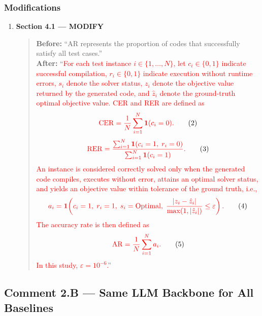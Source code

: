 \documentclass[11pt,a4paper]{article}
\begin{document}
\subsubsection{Modifications}
\begin{enumerate}
\item \textbf{Section 4.1 --- MODIFY}
\begin{quote}
\textbf{Before:} ``AR represents the proportion of codes that successfully satisfy all test cases.''\\[4pt]
\textbf{After:} ``\textcolor{red}{For each test instance $i \in \{1,\dots,N\}$, let $c_i \in \{0,1\}$ indicate successful compilation, $r_i \in \{0,1\}$ indicate execution without runtime errors, $s_i$ denote the solver status, $z_i$ denote the objective value returned by the generated code, and $\hat z_i$ denote the ground-truth optimal objective value. CER and RER are defined as}
\begin{equation}
\textcolor{red}{\mathrm{CER}=\frac{1}{N}\sum_{i=1}^{N}\mathbf{1}(c_i=0).} \tag{2}
\end{equation}
\begin{equation}
\textcolor{red}{\mathrm{RER}=\frac{\sum_{i=1}^{N}\mathbf{1}(c_i=1,\; r_i=0)}{\sum_{i=1}^{N}\mathbf{1}(c_i=1)}.} \tag{3}
\end{equation}
\textcolor{red}{An instance is considered correctly solved only when the generated code compiles, executes without error, attains an optimal solver status, and yields an objective value within tolerance of the ground truth, i.e.,}
\begin{equation}
\textcolor{red}{a_i=\mathbf{1}\!\left(c_i=1,\; r_i=1,\; s_i=\mathrm{Optimal},\; \frac{|z_i-\hat z_i|}{\max(1,|\hat z_i|)}\le \varepsilon\right).} \tag{4}
\end{equation}
\textcolor{red}{The accuracy rate is then defined as}
\begin{equation}
\textcolor{red}{\mathrm{AR}=\frac{1}{N}\sum_{i=1}^{N} a_i.} \tag{5}
\end{equation}
\textcolor{red}{In this study, $\varepsilon = 10^{-6}$.}''
\end{quote}
\end{enumerate}

\subsection{Comment 2.B --- Same LLM Backbone for All Baselines}
\end{document}
